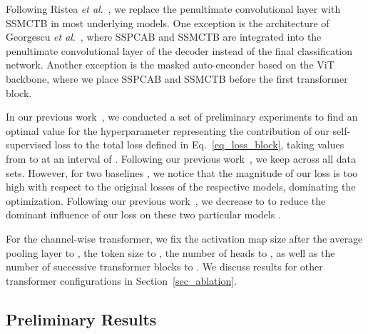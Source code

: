 \documentclass[10pt,journal,compsoc]{IEEEtran}
\newcommand{\etal}{\textit{et al}.}
\begin{document}
Following Ristea \etal~\cite{Ristea-CVPR-2022}, we replace the penultimate convolutional layer with SSMCTB in most underlying models. One exception is the architecture of Georgescu \etal~\cite{Georgescu-CVPR-2021}, where SSPCAB and SSMCTB are integrated into the penultimate convolutional layer of the decoder instead of the final classification network. Another exception is the masked auto-enconder \cite{He-CVPR-2022} based on the ViT backbone, where we place SSPCAB and SSMCTB before the first transformer block.

In our previous work~\cite{Ristea-CVPR-2022}, we conducted a set of preliminary experiments to find an optimal value for the hyperparameter  representing the contribution of our self-supervised loss to the total loss defined in Eq.~\eqref{eq_loss_block}, taking values from  to  at an interval of . Following our previous work~\cite{Ristea-CVPR-2022}, we keep  across all data sets. However, for two baselines \cite{Liu-ICCV-2021,Schulter-ECCV-2022}, we notice that the magnitude of our loss is too high with respect to the original losses of the respective models, dominating the optimization. Following our previous work~\cite{Ristea-CVPR-2022}, we decrease  to  to reduce the dominant influence of our loss on these two particular models \cite{Liu-ICCV-2021,Schulter-ECCV-2022}.

For the channel-wise transformer, we fix the activation map size after the average pooling layer to , the token size  to , the number of heads  to , as well as the number of successive transformer blocks  to . We discuss results for other transformer configurations in Section~\ref{sec_ablation}.

\subsection{Preliminary Results}
\end{document}
